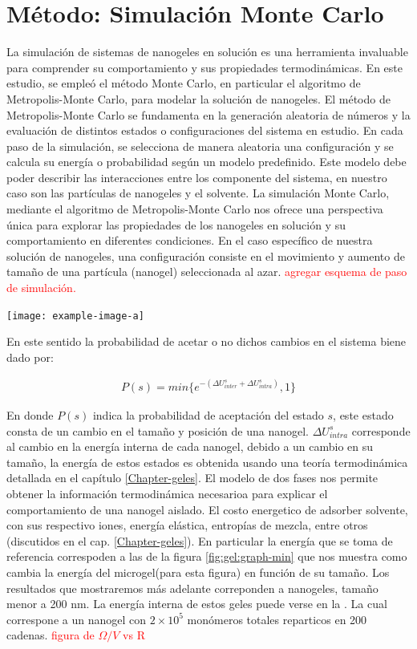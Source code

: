 \section{M\'etodo: Simulaci\'on Monte Carlo}


La simulaci\'on de sistemas de nanogeles en soluci\'on es una herramienta invaluable para comprender su comportamiento y sus propiedades termodin\'amicas. En este estudio, se emple\'o el m\'etodo Monte Carlo, en particular el algoritmo de Metropolis-Monte Carlo, para modelar la soluci\'on de nanogeles.
El m\'etodo de Metropolis-Monte Carlo \addcite se fundamenta en la generaci\'on aleatoria de n\'umeros y la evaluaci\'on de distintos estados o configuraciones del sistema en estudio. En cada paso de la simulaci\'on, se selecciona de manera aleatoria una configuraci\'on y se calcula su energ\'ia o probabilidad seg\'un un modelo predefinido. Este modelo debe poder describir las interacciones entre los componente del sistema, en nuestro caso son las part\'iculas de nanogeles y el solvente.
La simulaci\'on Monte Carlo, mediante el algoritmo de Metropolis-Monte Carlo nos ofrece una perspectiva \'unica para explorar las propiedades de los nanogeles en soluci\'on y su comportamiento en diferentes condiciones. 
En el caso espec\'ifico de nuestra soluci\'on de nanogeles, una configuraci\'on consiste en el movimiento y aumento de tama\~no de una part\'icula (nanogel) seleccionada al azar. 
\textcolor{red}{agregar esquema de paso de simulaci\'on.}

\texttt{[image: example-image-a]} 

En este sentido la probabilidad de acetar o no dichos cambios en el sistema biene dado por:

\begin{align}
	P(s) = min \{e^{-(\Delta U^s_{inter} + \Delta U^s_{intra})},1\}
\end{align}

En donde $P(s)$ indica la probabilidad de aceptaci\'on del estado $s$, este estado consta de un cambio en el tama\~no y posici\'on de una nanogel. $\Delta U^s_{intra}$ corresponde al cambio en la energ\'ia interna de cada nanogel, debido a un cambio en su tama\~no, la energ\'ia de estos estados es obtenida usando una teor\'ia termodin\'amica detallada en el cap\'itulo  \ref{Chapter-geles}. El modelo de dos fases nos permite obtener la informaci\'on termodin\'amica necesarioa para explicar el comportamiento de una nanogel aislado.
El costo energetico de adsorber solvente, con sus respectivo iones, energ\'ia el\'astica, entrop\'ias de mezcla, entre otros (discutidos en el cap. \ref{Chapter-geles}).
En particular la energ\'ia que se toma de referencia correspoden a las de la figura \ref{fig:gel:graph-min} que nos muestra como cambia la energ\'ia del microgel(para esta figura) en funci\'on de su tama\~no.
Los resultados que mostraremos m\'as adelante correponden a nanogeles, tama\~no menor a 200 nm.
La energ\'ia interna de estos geles puede verse en la . La cual correspone a un nanogel con $2\times10^5$ mon\'omeros totales reparticos en 200 cadenas. \textcolor{red}{figura de $\Omega/V$ vs R}

